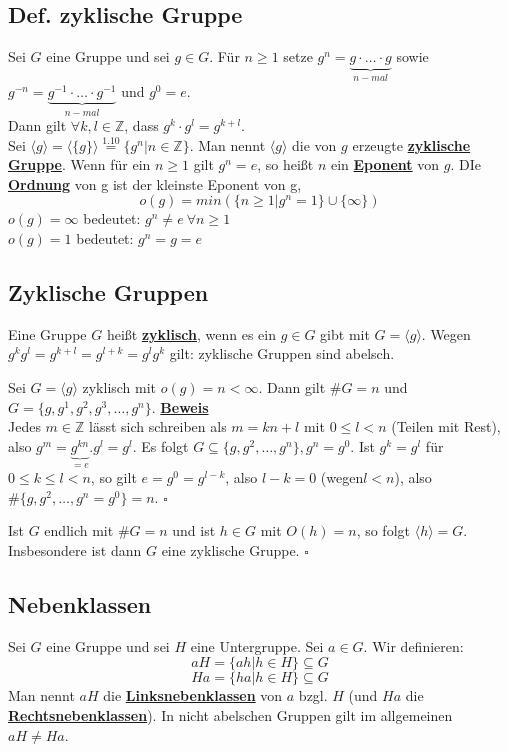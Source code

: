 \documentclass[a4paper, pagesize=pdftex, pdftex, twoside, headsepline, index=totoc,toc=listof, fontsize=10pt, cleardoublepage=empty, headinclude, DIV=13, BCOR=13mm]{scrartcl}
\newcommand{\bet}[1]{\uline{\textbf{#1}}} %
\newcommand{\Index}[1]{\uline{\textbf{#1}}\index{#1}} %
\newcommand{\enbrace}[1]{\ensuremath{\left( #1\right)}}
\newcommand{\lh}[1]{\langle #1 \rangle} %
\begin{document}
\subsection{Def. zyklische Gruppe}
\label{sub: def_zklische_gruppen}
Sei $G$ eine Gruppe und sei $g\in G$. Für $n\ge 1$ setze $g^n=\underbrace{g\cdot \dots \cdot g}_{n-mal}$ sowie $g^{-n}=\underbrace{g^{-1}\cdot \dots \cdot g^{-1}}_{n-mal}$ und $g^0=e$.\\
Dann gilt $\forall k,l\in \mathds{Z}$, dass $g^k\cdot g^l = g^{k+l}$.\\
Sei $\lh{g}=\lh{\{g\}}\stackrel{1.10}{=}\{g^n | n\in \mathds{Z}\}$. Man nennt $\lh{g}$ die von $g$ erzeugte \bet{zyklische Gruppe}. Wenn für ein $n\ge 1$ gilt $g^n=e$, so heißt $n$ ein \Index{Eponent} von $g$. DIe \Index{Ordnung} von g ist der kleinste Eponent von g,
\[o(g)=min\enbrace{\{n\ge 1 | g^n=1\}\cup \{\infty\}}\]
$o(g)=\infty$ bedeutet: $g^n\not= e~\forall n\ge 1$\\
$o(g)=1$ bedeutet: $g^n=g=e$

\subsection{Zyklische Gruppen}
\label{sub:zyklische_gruppen}
Eine Gruppe $G$ heißt \Index{zyklisch}, wenn es ein $g\in G$ gibt mit $G=\lh{g}$. Wegen $g^kg^l=g^{k+l}=g^{l+k}=g^lg^k$ gilt: zyklische Gruppen sind abelsch.

Sei $G=\lh{g}$ zyklisch mit $o(g)=n<\infty$. Dann gilt $\#G=n$ und $G=\{g,g^1,g^2,g^3,\dots,g^n\}$.
\bet{Beweis}\\
Jedes $m\in \mathds{Z}$ lässt sich schreiben als $m=kn+l$ mit $0\le l<n$ (Teilen mit Rest), also $g^m= \underbrace{g^{kn}}_{=e}.g^l=g^l$. Es folgt $G\subseteq \{g,g^2,\dots,g^n\}, g^n=g^0$.
Ist $g^k=g^l$ für $0\le k\le l<n$, so gilt $e=g^0=g^{l-k}$, also $l-k=0$ (wegen$l<n$), also $\#\{g,g^2,\dots,g^n=g^0\}=n$.
\hfill $\square$

Ist $G$ endlich mit $\#G=n$ und ist $h\in G$ mit $O(h)=n$, so folgt $\lh{h}=G$. Insbesondere ist dann $G$ eine zyklische Gruppe.
\hfill $\square$

\subsection{Nebenklassen}
\label{sub:nebenklassen}
 

Sei $G$ eine Gruppe und sei $H$ eine Untergruppe. Sei $a\in G$. Wir definieren:
\[aH=\{ah | h\in H\}\subseteq G\]
\[Ha=\{ha | h\in H\}\subseteq G\]
Man nennt $aH$ die \bet{Linksnebenklassen} von $a$ bzgl. $H$ (und $Ha$ die \bet{Rechtsnebenklassen}). In nicht abelschen Gruppen gilt im allgemeinen $aH\not=Ha$.
\end{document}
